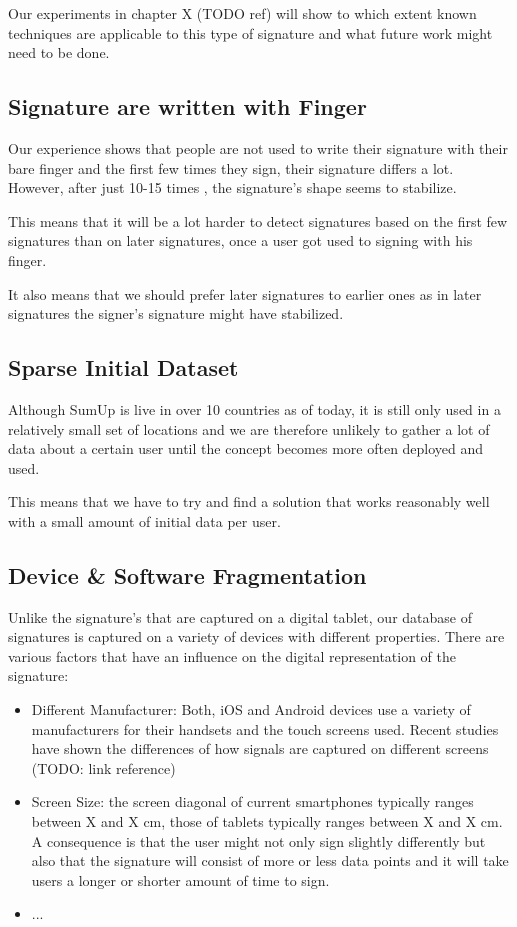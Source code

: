 \documentclass[a4paper, oneside]{csthesis}
\begin{document}
Our experiments in chapter X (TODO ref) will show to which extent known techniques are applicable to this type of signature and what future work might need to be done.

\subsection{Signature are written with Finger}

Our experience shows that people are not used to write their signature with their bare finger and the first few times they sign, their signature differs a lot. However, after just 10-15 times , the signature's shape seems to stabilize.

This means that it will be a lot harder to detect signatures based on the first few signatures than on later signatures, once a user got used to signing with his finger.

It also means that we should prefer later signatures to earlier ones as in later signatures the signer's signature might have stabilized.


\subsection{Sparse Initial Dataset}

Although SumUp is live in over 10 countries as of today, it is still only used in a relatively small set of locations and we are therefore unlikely to gather a lot of data about a certain user until the concept becomes more often deployed and used.

This means that we have to try and find a solution that works reasonably well with a small amount of initial data per user.


\subsection{Device \& Software Fragmentation}

Unlike the signature's that are captured on a digital tablet, our database of signatures is captured on a variety of devices with different properties. There are various factors that have an influence on the digital representation of the signature:

\begin{itemize}
\item Different Manufacturer: Both, iOS and Android devices use a variety of manufacturers for their handsets and the touch screens used. Recent studies have shown the differences of how signals are captured on different screens (TODO: link reference)
\item Screen Size: the screen diagonal of current smartphones typically ranges between X and X cm, those of tablets typically ranges between X and X cm. A consequence is that the user might not only sign slightly differently but also that the signature will consist of more or less data points and it will take users a longer or shorter amount of time to sign.
\item  ...
\end{itemize}
\end{document}
